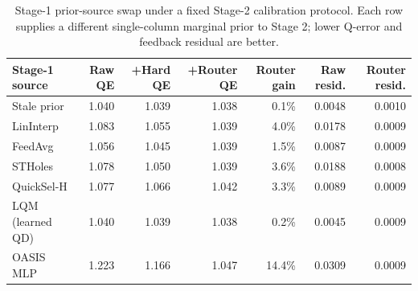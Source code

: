 \begin{table}[t]
  \centering
  \small
  \caption{Stage-1 prior-source swap under a fixed Stage-2 calibration protocol. Each row supplies a different single-column marginal prior to Stage 2; lower Q-error and feedback residual are better.}
  \label{tab:stage1_estimator_swap}
  \setlength{\tabcolsep}{4pt}
  \begin{tabular}{lrrrrrr}
    \toprule
    Stage-1 source & Raw QE & +Hard QE & +Router QE & Router gain & Raw resid. & Router resid. \\
    \midrule
    Stale prior & 1.040 & 1.039 & 1.038 & 0.1\% & 0.0048 & 0.0010 \\
    LinInterp & 1.083 & 1.055 & 1.039 & 4.0\% & 0.0178 & 0.0009 \\
    FeedAvg & 1.056 & 1.045 & 1.039 & 1.5\% & 0.0087 & 0.0009 \\
    STHoles & 1.078 & 1.050 & 1.039 & 3.6\% & 0.0188 & 0.0008 \\
    QuickSel-H & 1.077 & 1.066 & 1.042 & 3.3\% & 0.0089 & 0.0009 \\
    LQM (learned QD) & 1.040 & 1.039 & 1.038 & 0.2\% & 0.0045 & 0.0009 \\
    OASIS MLP & 1.223 & 1.166 & 1.047 & 14.4\% & 0.0309 & 0.0009 \\
    \bottomrule
  \end{tabular}
\end{table}
